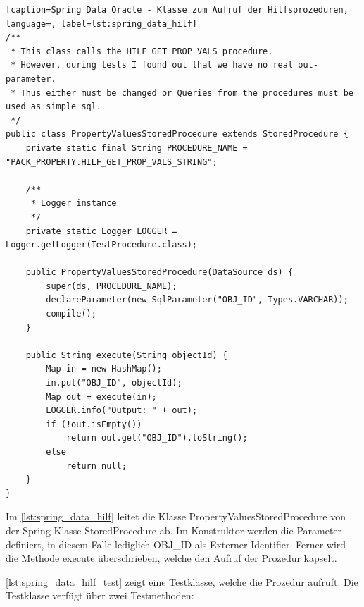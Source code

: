 \begin{lstlisting}[caption=Spring Data Oracle - Klasse zum Aufruf der Hilfsprozeduren, language=, label=lst:spring_data_hilf]
/**
 * This class calls the HILF_GET_PROP_VALS procedure.
 * However, during tests I found out that we have no real out-parameter.
 * Thus either must be changed or Queries from the procedures must be used as simple sql.
 */
public class PropertyValuesStoredProcedure extends StoredProcedure {
    private static final String PROCEDURE_NAME = "PACK_PROPERTY.HILF_GET_PROP_VALS_STRING";

    /**
     * Logger instance
     */
    private static Logger LOGGER = Logger.getLogger(TestProcedure.class);

    public PropertyValuesStoredProcedure(DataSource ds) {
        super(ds, PROCEDURE_NAME);
        declareParameter(new SqlParameter("OBJ_ID", Types.VARCHAR));
        compile();
    }

    public String execute(String objectId) {
        Map in = new HashMap();
        in.put("OBJ_ID", objectId);
        Map out = execute(in);
        LOGGER.info("Output: " + out);
        if (!out.isEmpty())
            return out.get("OBJ_ID").toString();
        else
            return null;
    }
}
\end{lstlisting}

Im \autoref{lst:spring_data_hilf} leitet die Klasse PropertyValuesStoredProcedure von der Spring-Klasse StoredProcedure ab. Im Konstruktor werden die Parameter definiert, in diesem Falle lediglich OBJ\_ID als Externer Identifier. Ferner wird die Methode execute überschrieben, welche den Aufruf der Prozedur kapselt. 

\autoref{lst:spring_data_hilf_test} zeigt eine Testklasse, welche die Prozedur aufruft. Die Testklasse verfügt über zwei Testmethoden:


